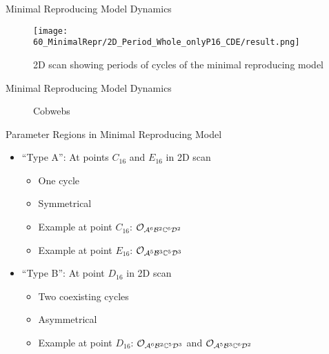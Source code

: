 \begin{frame}{Minimal Reproducing Model Dynamics}
    \vspace{-1.0em}
    \begin{figure}
        \centering
        \texttt{[image: 60\_MinimalRepr/2D\_Period\_Whole\_onlyP16\_CDE/result.png]}
        \caption{2D scan showing periods of cycles of the minimal reproducing model}
    \end{figure}
\end{frame}

\begin{frame}{Minimal Reproducing Model Dynamics}
    \begin{figure}
        \centering
        \caption{Cobwebs}
    \end{figure}
\end{frame}

\begin{frame}{Parameter Regions in Minimal Reproducing Model}
    \begin{itemize}
        \item ``Type A'': At points $C_{16}$ and $E_{16}$ in 2D scan
              \begin{itemize}
                  \item One cycle
                  \item Symmetrical
                  \item Example at point $C_{16}$: $\mathcal{O}_{\mathcal{A}^6\mathcal{B}^2\mathbb{C}^6\mathcal{D}^2}$
                  \item Example at point $E_{16}$: $\mathcal{O}_{\mathcal{A}^5\mathcal{B}^3\mathbb{C}^5\mathcal{D}^3}$ \vspace*{1em}
              \end{itemize}
        \item ``Type B'': At point $D_{16}$ in 2D scan
              \begin{itemize}
                  \item Two coexisting cycles
                  \item Asymmetrical
                  \item Example at point $D_{16}$: $\mathcal{O}_{\mathcal{A}^6\mathcal{B}^2\mathbb{C}^5\mathcal{D}^3}$ and $\mathcal{O}_{\mathcal{A}^5\mathcal{B}^3\mathbb{C}^6\mathcal{D}^2}$
              \end{itemize}
    \end{itemize}
\end{frame}

